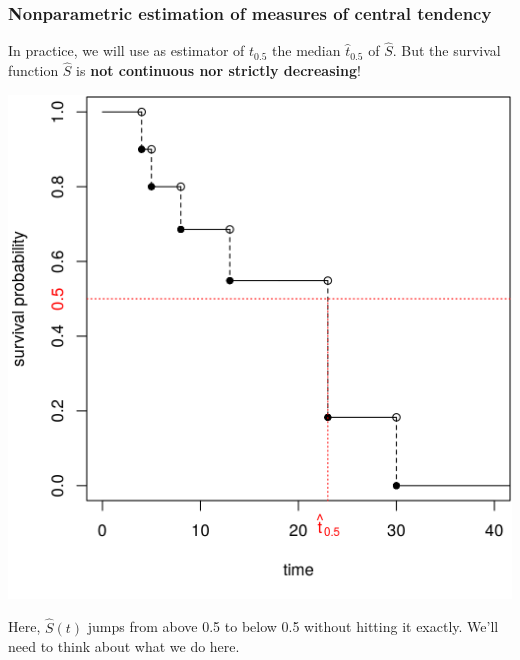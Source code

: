 \documentclass[10pt,t]{beamer}
\begin{document}
\begin{frame}
\frametitle{Nonparametric estimation of measures of central tendency}
In practice, we will use as estimator of $t_{0.5}$ the median $\hat{t}_{0.5}$ of $\widehat{S}$. But the survival function $\widehat{S}$ is \textbf{not continuous nor strictly decreasing}!

\begin{center}
\includegraphics[width=0.6\textheight]{figs/km_small_example_median.png}
\end{center}
Here, $\hat{S}(t)$ jumps from above 0.5 to below 0.5 without hitting it exactly. We'll need to think about what we do here. 
\end{frame}
 
\end{document}
